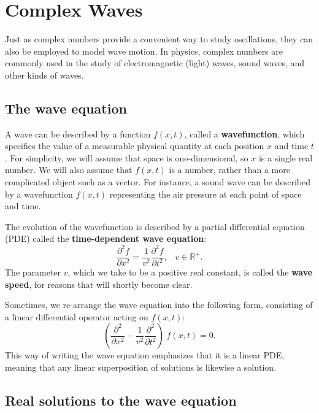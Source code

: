 \documentclass[10pt,a4paper]{article}
\begin{document}
\setcounter{page}{38}

\section{Complex Waves}
\label{complex-waves}

Just as complex numbers provide a convenient way to study
oscillations, they can also be employed to model wave motion. In
physics, complex numbers are commonly used in the study of
electromagnetic (light) waves, sound waves, and other kinds of waves.


\subsection{The wave equation}
\label{the-wave-equation}

A wave can be described by a function $f(x,t)$, called a
\textbf{wavefunction}, which specifies the value of a measurable
physical quantity at each position $x$ and time $t$. For simplicity,
we will assume that space is one-dimensional, so $x$ is a single real
number. We will also assume that $f(x,t)$ is a number, rather than a
more complicated object such as a vector. For instance, a sound wave
can be described by a wavefunction $f(x,t)$ representing the air
pressure at each point of space and time.

The evolution of the wavefunction is described by a partial
differential equation (PDE) called the \textbf{time-dependent wave
  equation}:
\begin{equation}
\frac{\partial^2 f}{\partial x^2} = \frac{1}{v^2} \frac{\partial^2 f}{\partial t^2}, \;\;\; v \in\mathbb{R}^+.
\end{equation}
The parameter $v$, which we take to be a positive real constant, is
called the \textbf{wave speed}, for reasons that will shortly become
clear.

Sometimes, we re-arrange the wave equation into the following form,
consisting of a linear differential operator acting on $f(x,t)$:
\begin{equation}
\left(\frac{\partial^2}{\partial x^2} - \frac{1}{v^2} \frac{\partial^2}{\partial t^2}\right) \; f(x,t) = 0.
\end{equation}
This way of writing the wave equation emphasizes that it is a linear
PDE, meaning that any linear superposition of solutions is likewise a
solution.

\subsection{Real solutions to the wave equation}
\label{real-solutions-to-the-wave-equation}
\end{document}
